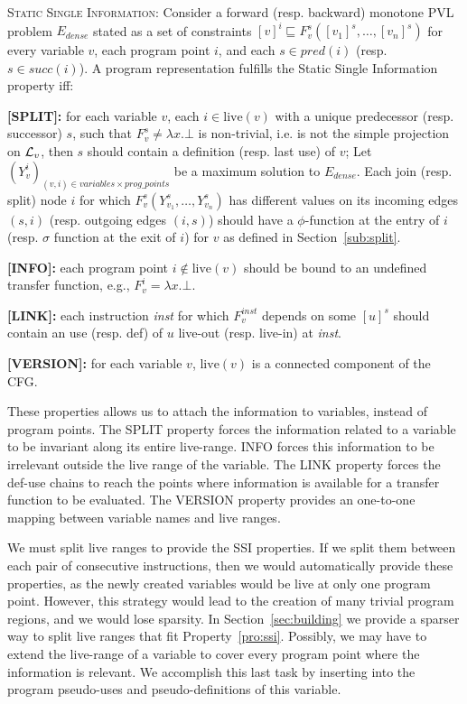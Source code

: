 \begin{property}[SSI]
\label{pro:ssi}\textsc{Static Single Information:} Consider a forward (resp. backward) monotone PVL problem $E_{dense}$ stated as a set of constraints $[v]^i \sqsubseteq F_v^s([v_1]^s,\dots,[v_n]^s)$ for every variable $v$, each program point $i$, and each $s \in \mathit{pred}(i)$ (resp. $s\in \mathit{succ}(i)$).
A program representation fulfills the Static Single Information property iff:\begin{description}
\item {\bf [SPLIT]:} for each variable $v$, each $i\in \textrm{live}(v)$ with a unique predecessor (resp. successor) $s$, such that $F_v^s\neq \lambda x.\bot$ is non-trivial, i.e. is not the simple projection on ${\cal L}_v$, then $s$ should contain a definition (resp. last use) of $v$; 
Let $(Y_v^i)_{(v,i)\in variables\times prog\_points}$ be a maximum solution to $E_{dense}$. 
Each join (resp. split) node $i$ for which $F_v^s(Y_{v_1}^s,\dots,Y_{v_n}^s)$ has different values on its incoming edges $(s,i)$ (resp. outgoing edges $(i,s)$) should have a $\phi$-function at the entry of $i$ (resp. $\sigma$ function at the exit of $i$) for $v$
as defined in Section~\ref{sub:split}.
\item {\bf [INFO]:} each program point $i\not\in \textrm{live}(v)$ should be bound to an undefined  transfer function, e.g., $F_v^i=\lambda x.\bot$.
\item {\bf [LINK]:} each instruction {\em inst} for which $F_v^{inst}$ depends on some $[u]^s$ should contain an use (resp. def) of $u$ live-out (resp. live-in) at
{\em inst}.
\item {\bf [VERSION]:} for each variable $v$, $\textrm{live}(v)$ is a connected component of the CFG.
\end{description}
\end{property}

These properties allows us to attach the information to variables, instead of program points.
The {SPLIT} property forces the information related to a variable to be invariant along its entire live-range.
{INFO} forces this information to be irrelevant outside the live range of the variable.
The {LINK} property forces the def-use chains to reach the points where information is available for a transfer function to be evaluated.
The {VERSION} property provides an one-to-one mapping between variable names and live ranges.

We must split live ranges to provide the SSI properties.
If we split them between each pair of consecutive instructions, then we would automatically provide these properties, as the newly created variables
would be live at only one program point.
However, this strategy would lead to the creation of many trivial program regions, and we would lose sparsity.
In Section~\ref{sec:building} we provide a sparser way to split live ranges that fit Property~\ref{pro:ssi}.
Possibly, we may have to extend the live-range of a variable to cover every program point where the information is relevant.
We accomplish this last task by inserting into the program pseudo-uses and pseudo-definitions of this variable.

